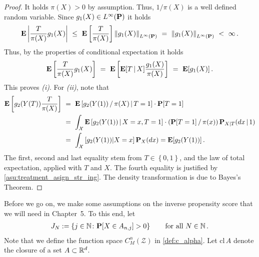  \begin{proof}
   It holds $\pi(X)>0$ by assumption. Thus, $1/\pi(X)$ is a well defined random variable.
Since $g_1(X)\in L^\infty(\P)$
it holds
\begin{align*}
    \E
    \left|
    \frac{T}{\pi(X)}
    g_1(X)
    \right|
    \ 
    \le
    \ 
    \E
    \left[
    \frac{T}{\pi(X)}
    \right]
    \norm{
    g_1(X)
  }_{L^\infty(\P)}
    \ 
  =
    \ 
    \norm{
    g_1(X)
  }_{L^\infty(\P)}
    \ 
  <
    \ 
  \infty
  \,.
\end{align*}
Thus, by the properties of conditional expectation it holds
\begin{align*}
    \E
    \left[
    \frac{T}{\pi(X)}
    g_1(X)
    \right]
    \ 
    =
    \ 
    \E
    \left[
      \E[T\,|\,X]
    \frac{g_1(X)}{\pi(X)}
    \right]
    \ 
    =
    \ 
    \E[g_1(X)]
    \,.
\end{align*}
This proves \textit{(i)}.
For \textit{(ii)}, note that
\begin{align}
  \begin{split}
    \E
    \left[ 
g_2(Y(T))
      \frac{T}{\pi(X)}
    \right]
  &\ =\ 
  \E
  \left[ 
g_2(Y(1))
    \,
    /
    \,
    \pi(X)
    \,
    \vert
    \,
    T=1
  \right]
  \cdot
  \P[T=1]
  \\
  &\ =\ 
  \int_\mathcal{X}
  \E
  \left[ 
g_2(Y(1))
    \,
    \vert
    \,
    X=x
    ,
    T=1
  \right]
  \cdot
  (
  \P[T=1]
  \,
  /
  \,
  \pi(x)
  )
  \,
  \P_{X|T}(dx\,|\,1)
  \\
  &\ =\ 
  \int_\mathcal{X}
  \left[ 
g_2(Y(1))
    \vert
    X=x
  \right]
  \P_X(dx)
  =
  \E[
g_2(Y(1))
  ]
\,.
\end{split}
\end{align}
The first, second and last equality stem from 
$
  T\in \left\{ 0,1 \right\}
$,
and the law of total expectation, applied with $T$ and $X$.
The fourth equality is justified by 
\eqref{asu:treatment_asign_str_ing}.
The density transformation is due to Bayes's Theorem.
 \end{proof}
 Before we go on, we make some assumptions on the inverse propensity score that we will need in Chapter~5.
 To this end, let 
 \begin{align*}
   J_N
   :=
   \left\{ j\in\mathbb{N}\colon
     \P[X\in A_{n,j}]>0
   \right\}
   \qquad
   \text{for all}\ 
   N\in \mathbb{N}
   \,.
 \end{align*}
 Note that we define the function space $C^\alpha_M(\mathcal{Z})$ in
\eqref{def:c_alpha}.
Let $\mathrm{cl}\, A$ denote the closure of a set $A\subset \R^d$.
